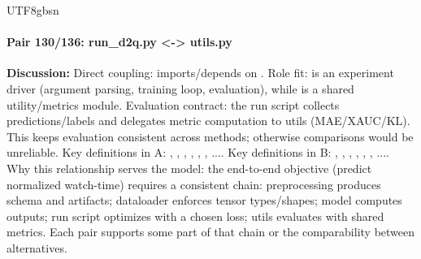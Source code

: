 \documentclass[11pt]{article}
\begin{document}
\begin{CJK*}{UTF8}{gbsn}
\paragraph{Pair 130/136: run\_d2q.py <-> utils.py}
\textbf{Discussion:} Direct coupling: \texttt{} imports/depends on \texttt{}. Role fit: \texttt{} is an experiment driver (argument parsing, training loop, evaluation), while \texttt{} is a shared utility/metrics module. Evaluation contract: the run script collects predictions/labels and delegates metric computation to utils (MAE/XAUC/KL). This keeps evaluation consistent across methods; otherwise comparisons would be unreliable. Key definitions in A: \texttt{}, \texttt{}, \texttt{}, \texttt{}, \texttt{}, \texttt{}, .... Key definitions in B: \texttt{}, \texttt{}, \texttt{}, \texttt{}, \texttt{}, \texttt{}, .... Why this relationship serves the model: the end-to-end objective (predict normalized watch-time) requires a consistent chain: preprocessing produces schema and artifacts; dataloader enforces tensor types/shapes; model computes outputs; run script optimizes with a chosen loss; utils evaluates with shared metrics. Each pair supports some part of that chain or the comparability between alternatives.


\end{CJK*}
\end{document}
